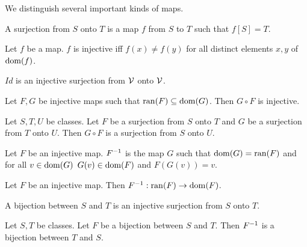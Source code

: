 \documentclass{article}
\begin{document}
We distinguish several important kinds of maps.
%
\begin{forthel}
\begin{definition}
A surjection from $S$
onto $T$ is a map $f$ from $S$ to $T$ such that $f[S] = T$.
\end{definition}

\begin{definition}
Let $f$ be a map. $f$ is injective iff $f(x) \neq f(y)$ for all
distinct elements $x,y$ of $\operatorname{dom}(f)$.
\end{definition}

\begin{lemma}
$Id$ is an injective surjection from ${\cal V}$ onto ${\cal V}$.
\end{lemma}

\begin{lemma}
Let $F,G$ be injective maps such that $\operatorname{ran}(F) \subseteq \operatorname{dom}(G)$.
Then $G \circ F$ is injective.
\end{lemma}

\begin{lemma} Let $S,T,U$ be classes. Let 
$F$ be a surjection from $S$ onto $T$ and $G$ be
a surjection from $T$ onto $U$. Then
$G \circ F$ is a surjection from $S$ onto $U$.
\end{lemma}

\begin{signature}
Let $F$ be an injective map.
$F^{-1}$ is the map $G$ such that $\operatorname{dom}(G) = \operatorname{ran}(F)$
and for all $v \in \operatorname{dom}(G)$ $G(v) \in \operatorname{dom}(F)$ and $F(G(v))=v$.
\end{signature}

\begin{lemma}
Let $F$ be an injective map. Then 
$F^{-1} : \operatorname{ran}(F) \rightarrow \operatorname{dom}(F)$.
\end{lemma}


\begin{definition}
A bijection between $S$ and $T$ is an injective surjection from
$S$ onto $T$.
\end{definition}

\begin{lemma} Let $S, T$ be classes.
Let $F$ be a bijection between $S$ and $T$.
Then $F^{-1}$ is a bijection between $T$ and $S$.
\end{lemma}
\end{forthel}
%
\end{document}
